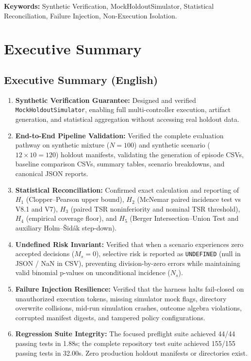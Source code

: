 \documentclass[10pt,a4paper]{article}
\begin{document}
\vspace{6pt}
\noindent \textbf{Keywords:} Synthetic Verification, MockHoldoutSimulator, Statistical Reconciliation, Failure Injection, Non-Execution Isolation.

\section{Executive Summary}

\subsection{Executive Summary (English)}
\begin{enumerate}
    \item \textbf{Synthetic Verification Guarantee:} Designed and verified \texttt{MockHoldoutSimulator}, enabling full multi-controller execution, artifact generation, and statistical aggregation without accessing real holdout data.
    \item \textbf{End-to-End Pipeline Validation:} Verified the complete evaluation pathway on synthetic mixture ($N=100$) and synthetic scenario ($12 \times 10 = 120$) holdout manifests, validating the generation of episode CSVs, baseline comparison CSVs, summary tables, scenario breakdowns, and canonical JSON reports.
    \item \textbf{Statistical Reconciliation:} Confirmed exact calculation and reporting of $H_1$ (Clopper--Pearson upper bound), $H_2$ (McNemar paired incidence test vs V8.1 and V7), $H_3$ (paired TSR noninferiority and nominal TSR threshold), $H_4$ (empirical coverage floor), and $H_5$ (Berger Intersection--Union Test and auxiliary Holm--Šidák step-down).
    \item \textbf{Undefined Risk Invariant:} Verified that when a scenario experiences zero accepted decisions ($M_s = 0$), selective risk is reported as \texttt{UNDEFINED} (null in JSON / NaN in CSV), preventing division-by-zero errors while maintaining valid binomial p-values on unconditional incidence ($N_s$).
    \item \textbf{Failure Injection Resilience:} Verified that the harness halts fail-closed on unauthorized execution tokens, missing simulator mock flags, directory overwrite collisions, mid-run simulation crashes, outcome algebra violations, corrupted manifest digests, and tampered policy configurations.
    \item \textbf{Regression Suite Integrity:} The focused preflight suite achieved 44/44 passing tests in 1.88s; the complete repository test suite achieved 155/155 passing tests in 32.00s. Zero production holdout manifests or directories exist.
\end{enumerate}
\end{document}
